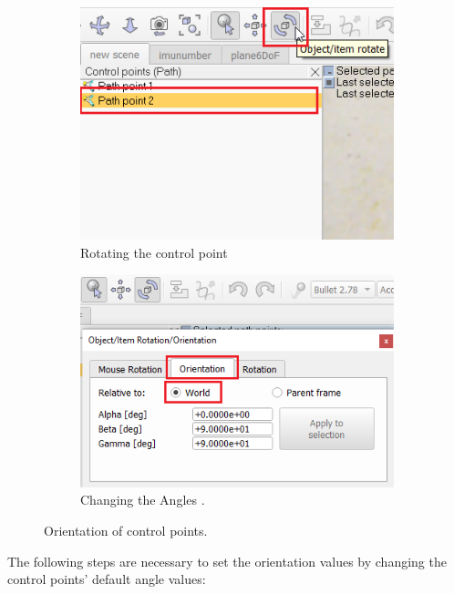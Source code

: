 \begin{figure}[h!]
  \centering
  \begin{subfigure}[b]{0.4\linewidth}
    \includegraphics[width=\linewidth]{figures/toggleRotation.png}
    \caption{Rotating the control point}
  \end{subfigure}
\quad
\begin{subfigure}[b]{0.4\linewidth}
    \includegraphics[width=\linewidth]{figures/changingAngles.png}
    \caption{Changing the Angles .}
  \end{subfigure}
 \caption{Orientation of control points.}
  \label{fig:orientationControlPoints}
\end{figure}


The following steps are necessary to set the orientation values by changing the control points' default angle values: 

